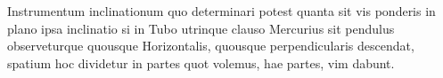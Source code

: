  \pstart  Instrumentum inclinationum\protect{} quo determinari potest  quanta sit vis  ponderis in plano   ipsa inclinatio  si in Tubo utrinque clauso Mercurius\protect{} sit pendulus  observeturque quousque  Horizontalis, quousque  perpendicularis descendat, spatium hoc dividetur in partes  quot volemus, hae partes, vim dabunt.\pend 
